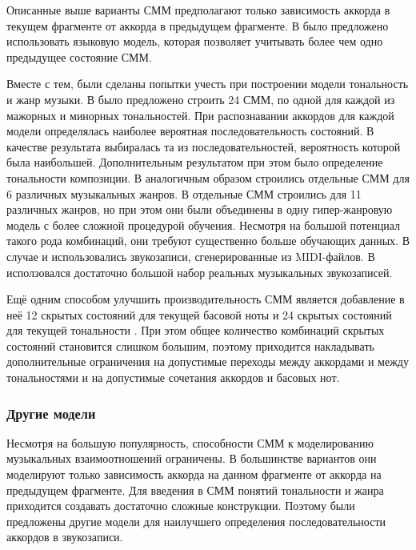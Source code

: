Описанные выше варианты СММ предполагают только зависимость аккорда в текущем
фрагменте от аккорда в предыдущем фрагменте. В \cite{Khadkevich2009} было
предложено использовать языковую модель, которая позволяет учитывать более чем
одно предыдущее состояние СММ.

Вместе с тем, были сделаны попытки учесть при построении модели тональность и
жанр музыки. В \cite{Lee2007} было предложено строить 24 СММ, по одной для
каждой из мажорных и минорных тональностей. При распознавании аккордов для
каждой модели определялась наиболее вероятная последовательность состояний. В
качестве результата выбиралась та из последовательностей, вероятность которой
была наибольшей. Дополнительным результатом при этом было определение
тональности композиции. В \cite{Lee2008} аналогичным образом строились отдельные
СММ для 6 различных музыкальных жанров. В \cite{Ni2012} отдельные СММ строились
для 11 различных жанров, но при этом они были объединены в одну гипер-жанровую
модель с более сложной процедурой обучения. Несмотря на большой потенциал такого
рода комбинаций, они требуют существенно больше обучающих данных. В случае
\cite{Lee2007} и \cite{Lee2008} использовались звукозаписи, сгенерированные из
MIDI-файлов. В \cite{Ni2012} исползовался достаточно большой набор реальных
музыкальных звукозаписей.

Ещё одним способом улучшить производительность СММ является добавление в неё
12 скрытых состояний для текущей басовой ноты и 24 скрытых состояний для текущей
тональности \cite{Ni2011}. При этом общее количество комбинаций скрытых
состояний становится слишком большим, поэтому приходится накладывать
дополнительные ограничения на допустимые переходы между аккордами и между
тональностями и на допустимые сочетания аккордов и басовых нот.

\subsubsection{Другие модели}

Несмотря на большую популярность, способности СММ к моделированию музыкальных
взаимоотношений ограничены. В большинстве вариантов они моделируют только
зависимость аккорда на данном фрагменте от аккорда на предыдущем фрагменте. Для
введения в СММ понятий тональности и жанра приходится создавать достаточно
сложные конструкции. Поэтому были предложены другие модели для наилучшего
определения последовательности аккордов в звукозаписи.

